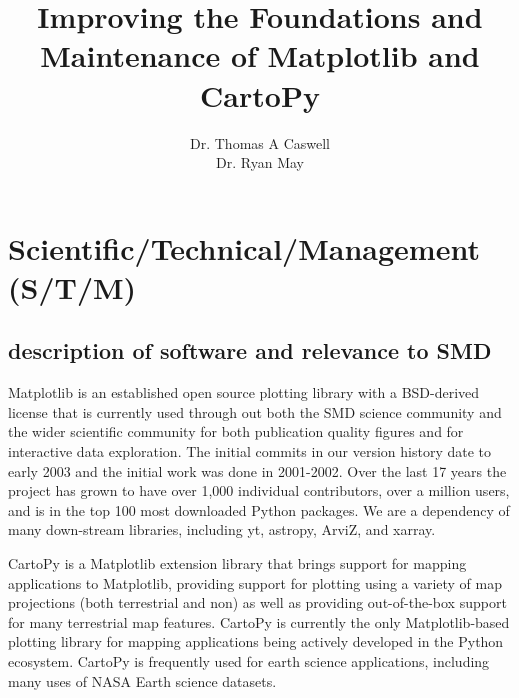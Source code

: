 \documentclass[12pt]{article}
\numberwithin{page}{section}
\begin{document}
\title{Improving the Foundations and Maintenance of Matplotlib and CartoPy}
\author{Dr. Thomas A Caswell\\Dr. Ryan May}
\date{}
\maketitle

\setcounter{tocdepth}{2}
\tableofcontents
\thispagestyle{empty}
\newpage

\section{Scientific/Technical/Management (S/T/M)}
\setcounter{page}{1}

\subsection{description of software and relevance to SMD}

Matplotlib is an established open source plotting library with a
BSD-derived license that is currently used through out both the SMD
science community and the wider scientific community for both
publication quality figures and for interactive data exploration.  The
initial commits in our version history date to early 2003 and the
initial work was done in 2001-2002. Over the last 17 years the project
has grown to have over 1,000 individual contributors, over a million
users, and is in the top 100 most downloaded Python packages. We are a
dependency of many down-stream libraries, including yt, astropy,
ArviZ, and xarray.


CartoPy is a Matplotlib extension library that brings support for
mapping applications to Matplotlib, providing support for plotting
using a variety of map projections (both terrestrial and non) as well
as providing out-of-the-box support for many terrestrial map
features. CartoPy is currently the only Matplotlib-based plotting
library for mapping applications being actively developed in the
Python ecosystem. CartoPy is frequently used for earth science
applications, including many uses of NASA Earth science datasets.
\end{document}
